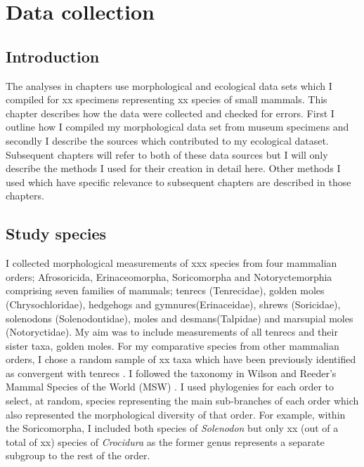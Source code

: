 \chapter{Data collection}
\label{chap:methods}

\section{Introduction}

The analyses in chapters %
use morphological and ecological data sets which I compiled for xx specimens representing xx species of small mammals. This chapter describes how the data were collected and checked for errors. First I outline how I compiled my morphological data set from museum specimens and secondly I describe the sources which contributed to my ecological dataset. Subsequent chapters will refer to both of these data sources but I will only describe the methods I used for their creation in detail here. Other methods I used which have specific relevance to subsequent chapters are described in those chapters.   

\section{Study species}
I collected morphological measurements of xxx species from  four mammalian orders; Afrosoricida, Erinaceomorpha, Soricomorpha and Notoryctemorphia comprising seven families of mammals; tenrecs (Tenrecidae), golden moles (Chrysochloridae), hedgehogs and gymnures(Erinaceidae), shrews (Soricidae), solenodons (Solenodontidae), moles and desmans(Talpidae) and marsupial moles (Notoryctidae).
My aim was to include measurements of all tenrecs and their sister taxa, golden moles.  For my  comparative species from other mammalian orders, I chose a random sample of xx taxa which have been previously identified as convergent with tenrecs \citep[e.g.][]{Gould1966, Symonds2005, Poux2008, Olson2013}. I followed the taxonomy in Wilson and Reeder's Mammal Species of the World (MSW) \citeyearpar{Wilson2005}. I used phylogenies for each order to select, at random, species representing the main sub-branches of each order which also represented the morphological diversity of that order. For example, within the Soricomorpha, I included both species of \textit{Solenodon} but only xx (out of a total of xx) species of \textit{Crocidura} as the former genus represents a separate subgroup to the rest of the order. 
